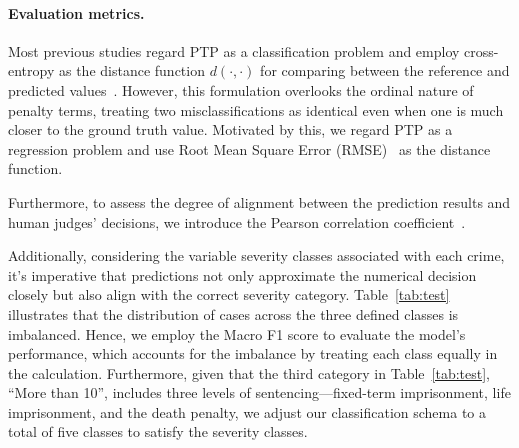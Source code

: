 \paragraph{Evaluation metrics.}
Most previous studies regard PTP as a classification problem and employ cross-entropy as the distance function $d(\cdot,\cdot)$ for comparing between the reference and predicted values~\cite{feng-etal-2022-legal,ML-LJP}. 
However, this formulation overlooks the ordinal nature of penalty terms, treating two misclassifications as identical even when one is much closer to the ground truth value. Motivated by this, we regard PTP as a regression problem and use Root Mean Square Error (RMSE)~\cite{chai2014root} as the distance function. 

Furthermore, to assess the degree of alignment between the prediction results and human judges' decisions, we introduce the Pearson correlation coefficient~\cite{cohen2009pearson}. 

Additionally, considering the variable severity classes associated with each crime, it's imperative that predictions not only approximate the numerical decision closely but also align with the correct severity category. Table~\ref{tab:test} illustrates that the distribution of cases across the three defined classes is imbalanced. Hence, we employ the Macro F1 score to evaluate the model's performance, which accounts for the imbalance by treating each class equally in the calculation. Furthermore, given that the third category in Table~\ref{tab:test}, ``More than 10'', includes three levels of sentencing—fixed-term imprisonment, life imprisonment, and the death penalty, we adjust our classification schema to a total of five classes to satisfy the severity classes.